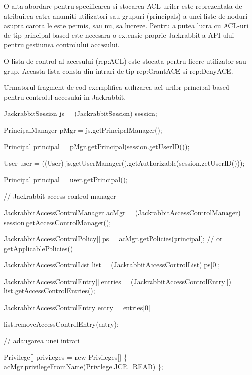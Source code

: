 \documentclass{article}
\begin{document}
O alta abordare pentru specificarea si stocarea ACL-urilor este reprezentata de atribuirea catre anumiti utilizatori sau grupuri (principals) a unei liste de noduri asupra carora le este permis, sau nu, sa lucreze. Pentru a putea lucra cu ACL-uri de tip principal-based este necesara o extensie proprie Jackrabbit a API-ului pentru gestiunea controlului accesului.

O lista de control al accesului (rep:ACL) este stocata pentru fiecre utilizator sau grup. Aceasta lista consta din intrari de tip rep:GrantACE si rep:DenyACE.

Urmatorul fragment de cod exemplifica utilizarea acl-urilor principal-based pentru controlul accesului in Jackrabbit.


\bigskip

JackrabbitSession js = (JackrabbitSession) session;


\bigskip

PrincipalManager pMgr = js.getPrincipalManager();

Principal principal = pMgr.getPrincipal(session.getUserID());


\bigskip

User user = ((User) js.getUserManager().getAuthorizable(session.getUserID()));

Principal principal = user.getPrincipal();


\bigskip

// Jackrabbit access control manager

JackrabbitAccessControlManager acMgr = (JackrabbitAccessControlManager) session.getAccessControlManager();


\bigskip

JackrabbitAccessControlPolicy[] ps = acMgr.getPolicies(principal); // or getApplicablePolicies()

JackrabbitAccessControlList list = (JackrabbitAccessControlList) ps[0];


\bigskip

JackrabbitAccessControlEntry[] entries = (JackrabbitAccessControlEntry[]) list.getAccessControlEntries();

JackrabbitAccessControlEntry entry = entries[0];


\bigskip

list.removeAccessControlEntry(entry);


\bigskip

// adaugarea unei intrari

Privilege[] privileges = new Privileges[] \{ acMgr.privilegeFromName(Privilege.JCR\_READ) \};
\end{document}
